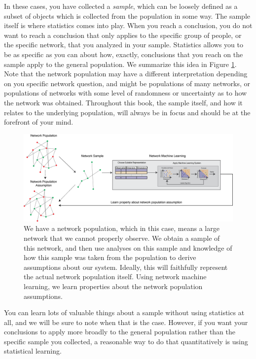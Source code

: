 In these cases, you have collected a \textit{sample}, which can be loosely defined as a subset of objects which is collected from the population in some way. The sample itself is where statistics comes into play. When you reach a conclusion, you do not want to reach a conclusion that only applies to the specific group of people, or the specific network, that you analyzed in your sample. Statistics allows you to be as specific as you can about how, exactly, conclusions that you reach on the sample apply to the general population. We summarize this idea in Figure \ref{fig:ch1:stat-learning}. Note that the network population may have a different interpretation depending on you specific network question, and might be populations of many networks, or populations of networks with some level of randomness or uncertainty as to how the network was obtained. Throughout this book, the sample itself, and how it relates to the underlying population, will always be in focus and should be at the forefront of your mind. 

\begin{figure}[h]
    \centering
    \includegraphics[width=\linewidth]{foundations/ch1/Images/apply.png}
    \caption[Statistical network machine learning]{We have a network population, which in this case, means a large network that we cannot properly observe. We obtain a sample of this network, and then use analyses on this sample and knowledge of how this sample was taken from the population to derive assumptions about our system. Ideally, this will faithfully represent the actual network population itself. Using network machine learning, we learn properties about the network population assumptions.}
    \label{fig:ch1:stat-learning}
\end{figure}


You {can} learn lots of valuable things about a sample without using statistics {at all}, and we will be sure to note when that is the case. However, if you want your conclusions to apply more broadly to the general population rather than the specific sample you collected, a reasonable way to do that quantitatively is using statistical learning.


